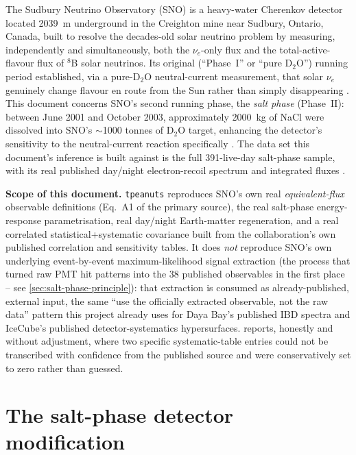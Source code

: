 The Sudbury Neutrino Observatory (SNO) is a heavy-water Cherenkov detector
located 2039~m underground in the Creighton mine near Sudbury, Ontario,
Canada, built to resolve the decades-old solar neutrino problem by measuring,
independently and simultaneously, both the $\nu_e$-only flux and the
total-active-flavour flux of $^8$B solar neutrinos. Its original (``Phase~I''
or ``pure D$_2$O'') running period established, via a pure-D$_2$O
neutral-current measurement, that solar $\nu_e$ genuinely change flavour en
route from the Sun rather than simply disappearing
\parencite{Ahmad2002NCDiscovery}. This document concerns SNO's second running
phase, the \emph{salt phase} (Phase~II): between June 2001 and October 2003,
approximately 2000~kg of NaCl were dissolved into SNO's $\sim$1000 tonnes of
D$_2$O target, enhancing the detector's sensitivity to the neutral-current
reaction specifically \parencite{Aharmim2005SaltPhase}. The data set this
document's inference is built against is the full 391-live-day salt-phase
sample, with its real published day/night electron-recoil spectrum and
integrated fluxes \parencite{Aharmim2005SaltPhase}.

\begin{notebox}
\textbf{Scope of this document.} \texttt{tpeanuts} reproduces SNO's own real
\emph{equivalent-flux} observable definitions (Eq.~A1 of the primary source),
the real salt-phase energy-response parametrisation, real day/night
Earth-matter regeneration, and a real correlated statistical+systematic
covariance built from the collaboration's own published correlation and
sensitivity tables. It does \emph{not} reproduce SNO's own underlying
event-by-event maximum-likelihood signal extraction (the process that turned
raw PMT hit patterns into the 38 published observables in the first place --
see \cref{sec:salt-phase-principle}): that extraction is consumed as
already-published, external input, the same ``use the officially extracted
observable, not the raw data'' pattern this project already uses for
Daya Bay's published IBD spectra and IceCube's published detector-systematics
hypersurfaces.  reports, honestly and without adjustment,
where two specific systematic-table entries could not be transcribed with
confidence from the published source and were conservatively set to zero
rather than guessed.
\end{notebox}

\section{The salt-phase detector modification}
\label{sec:salt-phase-detector}


